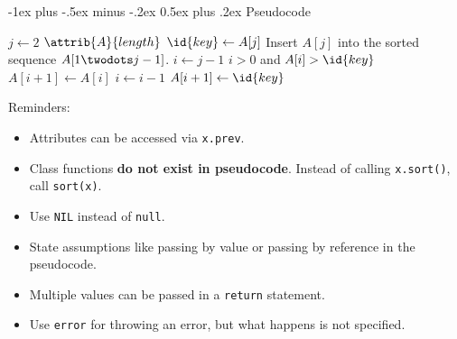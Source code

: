 \documentclass[letterpaper, 8pt]{extarticle}
\makeatletter
\renewcommand{\section}{\@startsection{section}{1}{0mm}%
                                {-1ex plus -.5ex minus -.2ex}%
                                {0.5ex plus .2ex}%
                                {\normalfont\normalsize\bfseries}}
\makeatother
\begin{document}
\begin{multicols*}{4}
  \section{Pseudocode}
  \begin{codebox}
  \li \For $j \gets 2$ \To $\attrib{A}{length}$
  \li   \Do
          $\id{key} \gets A[j]$
  \li     \Comment Insert $A[j]$ into the sorted sequence
            $A[1 \twodots j-1]$.
  \li     $i \gets j-1$
  \li     \While $i > 0$ and $A[i] > \id{key}$
  \li       \Do
              $A[i+1] \gets A[i]$
  \li         $i \gets i-1$
            \End
  \li     $A[i+1] \gets \id{key}$
        \End
  \end{codebox}
  Reminders:
  \begin{itemize}
    \item Attributes can be accessed via \verb|x.prev|.
    \item Class functions \textbf{do not exist in pseudocode}.
    Instead of calling \verb|x.sort()|, call \verb|sort(x)|.
    \item Use \verb|NIL| instead of \verb|null|.
    \item State assumptions like passing by value or passing by reference
    in the pseudocode.
    \item Multiple values can be passed in a \verb|return| statement.
    \item Use \verb|error| for throwing an error, but what happens is not specified.
  \end{itemize}

\end{multicols*}
\end{document}
